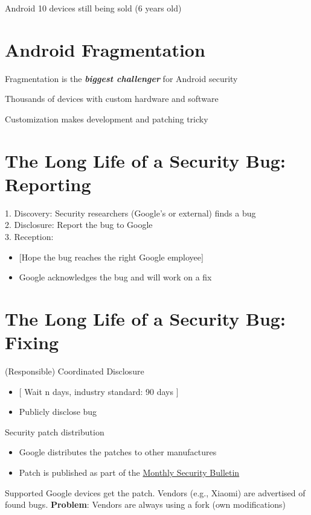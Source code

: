 \documentclass[11pt]{article}
\begin{document}
Android 10 devices still being sold (6 years old)

\section*{Android Fragmentation}

Fragmentation is the \textit{\textbf{biggest challenger}} for Android security

Thousands of devices with custom hardware and software

Customization makes development and patching tricky 

\section*{The Long Life of a Security Bug: Reporting}

1. Discovery: Security researchers (Google's or external) finds a bug \\
2. Disclosure: Report the bug to Google \\
3. Reception: 
\begin{itemize}
	\item $[$Hope the bug reaches the right Google employee$]$
	\item Google acknowledges the bug and will work on a fix
\end{itemize}

\newpage
\section*{The Long Life of a Security Bug: Fixing}
(Responsible) Coordinated Disclosure 

\begin{itemize}
	\item $[$ Wait n days, industry standard: 90 days $]$
	\item Publicly disclose bug
\end{itemize}

Security patch distribution
\begin{itemize}
	\item Google distributes the patches to other manufactures
	\item Patch is published as part of the \underline{Monthly Security Bulletin}
\end{itemize}

Supported Google devices get the patch. Vendors (e.g., Xiaomi) are advertised of found bugs. \textbf{Problem}: Vendors are always using a fork (own modifications) 
\end{document}
